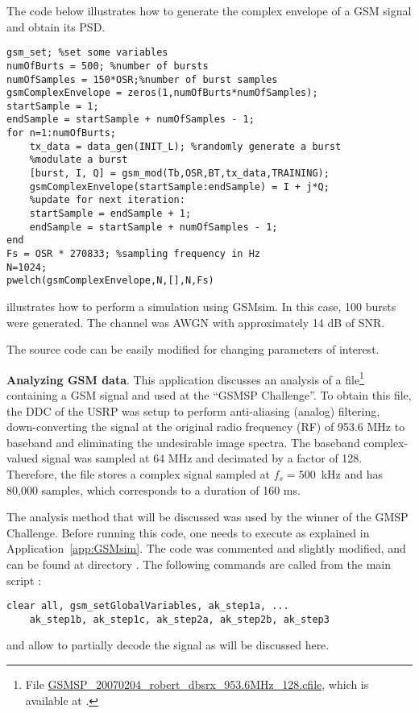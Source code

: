 The code below illustrates how to generate the complex envelope of a GSM signal and obtain its PSD.
\begin{lstlisting}
gsm_set; %set some variables
numOfBurts = 500; %number of bursts
numOfSamples = 150*OSR;%number of burst samples
gsmComplexEnvelope = zeros(1,numOfBurts*numOfSamples);
startSample = 1;
endSample = startSample + numOfSamples - 1;
for n=1:numOfBurts;
    tx_data = data_gen(INIT_L); %randomly generate a burst
    %modulate a burst
    [burst, I, Q] = gsm_mod(Tb,OSR,BT,tx_data,TRAINING);
    gsmComplexEnvelope(startSample:endSample) = I + j*Q;
    %update for next iteration:
    startSample = endSample + 1;
    endSample = startSample + numOfSamples - 1;
end
Fs = OSR * 270833; %sampling frequency in Hz
N=1024; 
pwelch(gsmComplexEnvelope,N,[],N,Fs)
\end{lstlisting}

 illustrates how to perform a simulation using GSMsim. In this case, 100 bursts were generated. The channel was AWGN with approximately 14 dB of SNR.



The source code can be easily modified for changing parameters of interest.
\eApplication


\bApplication \textbf{Analyzing GSM data}.
\label{app:GSM_data}
This application discusses an analysis of a file\footnote{File \url{GSMSP_20070204_robert_dbsrx_953.6MHz_128.cfile}, which is available at .} containing a GSM signal and used at the ``GSMSP Challenge''.
To obtain this file, the DDC of the USRP was setup to perform anti-aliasing (analog) filtering, down-converting the signal at the original radio frequency (RF) of 953.6 MHz to baseband and eliminating the undesirable image spectra. The baseband complex-valued signal was sampled at 64 MHz and decimated by a factor of 128. Therefore, the file stores a complex signal sampled at $f_s = 500$~kHz and has 80,000 samples, which corresponds to a duration of 160 ms.

The analysis method that will be discussed was used by the winner of the GMSP Challenge. 
Before running this code, one needs to execute  as explained in 
Application~\ref{app:GSMsim}.
The code was commented and slightly modified, and can be found at directory .
The following commands are called from the main script :
\begin{lstlisting}
clear all, gsm_setGlobalVariables, ak_step1a, ...
    ak_step1b, ak_step1c, ak_step2a, ak_step2b, ak_step3
\end{lstlisting}
and allow to partially decode the signal as will be discussed here.

